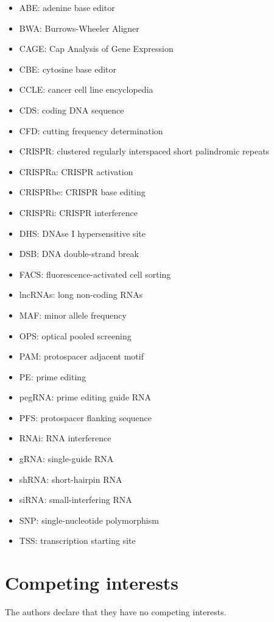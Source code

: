 \documentclass[pdftex,english,10pt]{article}
\begin{document}
{\begin{itemize}
\item ABE: adenine base editor
\item BWA: Burrows-Wheeler Aligner
\item CAGE: Cap Analysis of Gene Expression
\item CBE: cytosine base editor
\item CCLE: cancer cell line encyclopedia
\item CDS: coding DNA sequence
\item CFD: cutting frequency determination
\item CRISPR: clustered regularly interspaced short palindromic repeats
\item CRISPRa: CRISPR activation
\item CRISPRbe: CRISPR  base editing
\item CRISPRi: CRISPR interference
\item DHS: DNAse I hypersensitive site
\item DSB: DNA double-strand break
\item FACS: fluorescence-activated cell sorting
\item lncRNAs: long non-coding RNAs
\item MAF: minor allele frequency
\item OPS: optical pooled screening
\item PAM: protospacer adjacent motif
\item PE: prime editing
\item pegRNA: prime editing guide RNA
\item PFS: protospacer flanking sequence
\item RNAi: RNA interference
\item gRNA: single-guide RNA
\item shRNA: short-hairpin RNA
\item siRNA: small-interfering RNA
\item SNP: single-nucleotide polymorphism
\item TSS: transcription starting site
\end{itemize}


\section*{Competing interests}

The authors declare that they have no competing interests.

}
\end{document}

